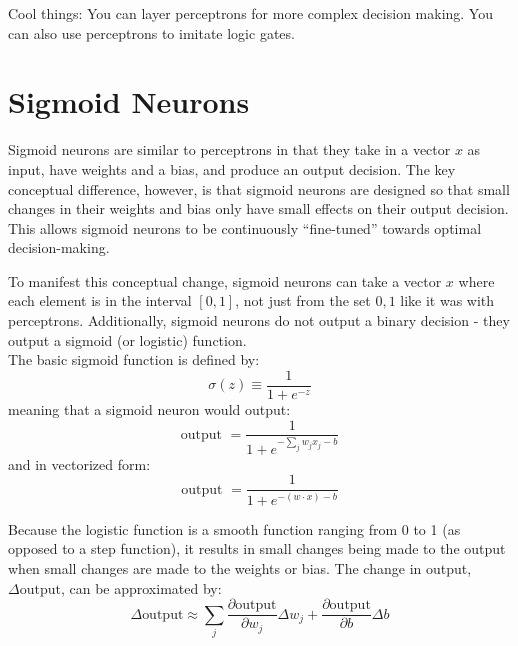 \documentclass{article}
\begin{document}
	Cool things: You can layer perceptrons for more complex decision making. You can also use perceptrons to imitate logic gates.

\section{Sigmoid Neurons}
	Sigmoid neurons are similar to perceptrons in that they take in a vector $x$ as input, have weights and a bias, and produce an output decision. The key conceptual difference, however, is that sigmoid neurons are designed so that small changes in their weights and bias only have small effects on their output decision. This allows sigmoid neurons to be continuously ``fine-tuned'' towards optimal decision-making. 

	To manifest this conceptual change, sigmoid neurons can take a vector $x$ where each element is in the interval $[0, 1]$, not just from the set ${0, 1}$ like it was with perceptrons. Additionally, sigmoid neurons do not output a binary decision - they output a sigmoid (or logistic) function. \\
	The basic sigmoid function is defined by:
	\begin{equation}
		\sigma (z) \equiv \frac{1}{1 + e^{-z}}
	\end{equation}
	meaning that a sigmoid neuron would output:
	\begin{equation}
		\text{output } = \frac{1}{1 + e^{-\sum_{j}w_j x_j - b}}
	\end{equation}
	and in vectorized form:
	\begin{equation}
		\text{output } = \frac{1}{1 + e^{- (w \cdot x) - b}}
	\end{equation}

	Because the logistic function is a smooth function ranging from 0 to 1 (as opposed to a step function), it results in small changes being made to the output when small changes are made to the weights or bias. The change in output, $\Delta \text{output}$,  can be approximated by:
	\begin{equation}
		\Delta \text{output} \approx \sum_{j} \frac{\partial \text{output}}{\partial w_j} \Delta w_j + \frac{\partial \text{output}}{\partial b} \Delta b
	\end{equation}
\end{document}

